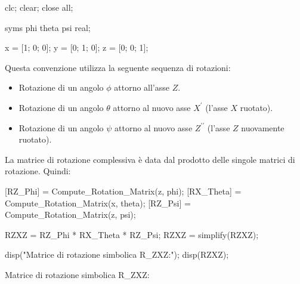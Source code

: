 \documentclass[11pt, a4paper]{article}
\begin{document}
\begin{matlabcode}
clc; clear; close all;

syms phi theta psi real;

x = [1; 0; 0];
y = [0; 1; 0];
z = [0; 0; 1];
\end{matlabcode}


\begin{par}
\begin{flushleft}
Questa convenzione utilizza la seguente sequenza di rotazioni:
\end{flushleft}
\end{par}

\begin{itemize}
\setlength{\itemsep}{-1ex}
   \item{\begin{flushleft} Rotazione di un angolo $\phi$ attorno all'asse $Z$. \end{flushleft}}
   \item{\begin{flushleft} Rotazione di un angolo $\theta$ attorno al nuovo asse $X^{\prime }$ (l'asse $X$ ruotato). \end{flushleft}}
   \item{\begin{flushleft} Rotazione di un angolo $\psi$ attorno al nuovo asse $Z^{\prime \prime }$ (l'asse $Z$ nuovamente ruotato). \end{flushleft}}
\end{itemize}

\begin{par}
\begin{flushleft}
La matrice di rotazione complessiva è data dal prodotto delle singole matrici di rotazione. Quindi:
\end{flushleft}
\end{par}

\begin{matlabcode}

[RZ_Phi] = Compute_Rotation_Matrix(z, phi);
[RX_Theta] = Compute_Rotation_Matrix(x, theta);
[RZ_Psi] = Compute_Rotation_Matrix(z, psi);

RZXZ = RZ_Phi * RX_Theta * RZ_Psi;
RZXZ = simplify(RZXZ);

disp("Matrice di rotazione simbolica R_ZXZ:");
disp(RZXZ);
\end{matlabcode}
\begin{matlaboutput}
Matrice di rotazione simbolica R_ZXZ:
\end{matlaboutput}
\end{document}
